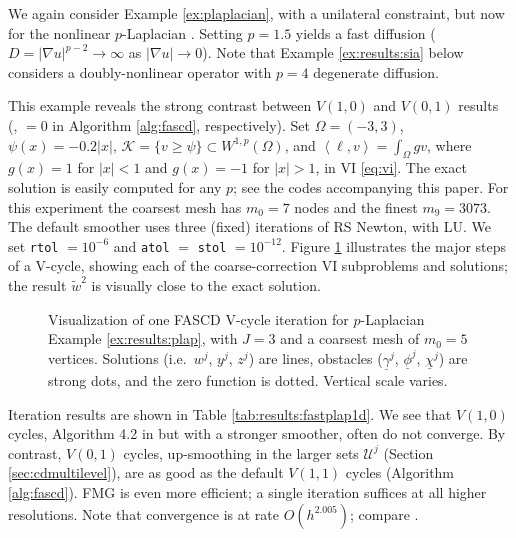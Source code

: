 \documentclass[review,hidelinks,onefignum,onetabnum]{siamart220329}
\newcommand{\grad}{\nabla}
\newcommand{\ip}[2]{\left<#1,#2\right>}
\begin{document}
\begin{example}  \label{ex:results:plap}
We again consider Example \ref{ex:plaplacian}, with a unilateral constraint, but now for the nonlinear $p$-Laplacian \cite{ChoeLewis1991}.  Setting $p=1.5$ yields a fast diffusion ($D=|\grad u|^{p-2}\to \infty$ as $|\grad u|\to 0$).  Note that Example \ref{ex:results:sia} below considers a doubly-nonlinear operator with $p=4$ degenerate diffusion.

This example reveals the strong contrast between $V(1,0)$ and $V(0,1)$ results (,  $=0$ in Algorithm \ref{alg:fascd}, respectively).  Set $\Omega=(-3,3)$, $\psi(x) = -0.2|x|$, $\mathcal{K} = \{v \ge \psi\} \subset W^{1,p}(\Omega)$, and $\ip\ell v = \int_\Omega g v$, where $g(x)=1$ for $|x|<1$ and $g(x)=-1$ for $|x|>1$, in VI \eqref{eq:vi}.  The exact solution is easily computed for any $p$; see the codes accompanying this paper.  For this experiment the coarsest mesh has $m_0=7$ nodes and the finest $m_9=3073$.  The default smoother uses three (fixed) iterations of RS Newton, with LU.  We set \texttt{rtol} $= 10^{-6}$ and \texttt{atol} $=$ \texttt{stol} $= 10^{-12}$.  Figure \ref{fig:imagesvcycle} illustrates the major steps of a V-cycle, showing each of the coarse-correction VI subproblems and solutions; the result $\tilde w^2$ is visually close to the exact solution.

\begin{figure}[ht]
\centering

\caption{Visualization of one FASCD V-cycle iteration for $p$-Laplacian Example \ref{ex:results:plap}, with $J=3$ and a coarsest mesh of $m_0=5$ vertices.  Solutions (i.e.~$w^j$, $y^j$, $z^j$) are lines, obstacles ($\underline{\gamma}^j$, $\underline{\phi}^j$, $\underline{\chi}^j$) are strong dots, and the zero function is dotted.  Vertical scale varies.}
\label{fig:imagesvcycle}
\end{figure}

Iteration results are shown in Table \ref{tab:results:fastplap1d}.  We see that $V(1,0)$ cycles, Algorithm 4.2 in \cite{GraeserKornhuber2009} but with a stronger smoother, often do not converge.  By contrast, $V(0,1)$ cycles, up-smoothing in the larger sets $\mathcal{U}^j$ (Section \ref{sec:cdmultilevel}), are as good as the default $V(1,1)$ cycles (Algorithm \ref{alg:fascd}).  FMG is even more efficient; a single iteration suffices at all higher resolutions.   Note that convergence is at rate $O(h^{2.005})$; compare \cite{ChoeLewis1991}.
\end{example}
\end{document}
